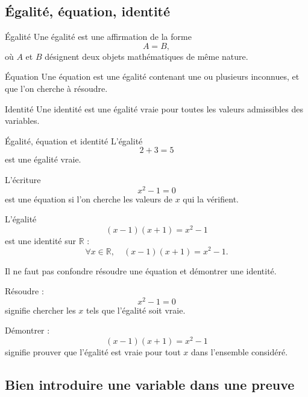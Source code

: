 \documentclass[11pt,a4paper]{article}
\begin{document}
\subsection{Égalité, équation, identité}

\begin{definitionbox}{Égalité}{}
Une égalité est une affirmation de la forme
\[
A=B,
\]
où $A$ et $B$ désignent deux objets mathématiques de même nature.
\end{definitionbox}

\begin{definitionbox}{Équation}{}
Une équation est une égalité contenant une ou plusieurs inconnues, et que l'on cherche à résoudre.
\end{definitionbox}

\begin{definitionbox}{Identité}{}
Une identité est une égalité vraie pour toutes les valeurs admissibles des variables.
\end{definitionbox}

\begin{exemplebox}{Égalité, équation et identité}{}
L'égalité
\[
2+3=5
\]
est une égalité vraie.

L'écriture
\[
x^2-1=0
\]
est une équation si l'on cherche les valeurs de $x$ qui la vérifient.

L'égalité
\[
(x-1)(x+1)=x^2-1
\]
est une identité sur $\mathbb{R}$ :
\[
\forall x\in\mathbb{R},\quad (x-1)(x+1)=x^2-1.
\]
\end{exemplebox}

\begin{erreurbox}
Il ne faut pas confondre résoudre une équation et démontrer une identité.

Résoudre :
\[
x^2-1=0
\]
signifie chercher les $x$ tels que l'égalité soit vraie.

Démontrer :
\[
(x-1)(x+1)=x^2-1
\]
signifie prouver que l'égalité est vraie pour tout $x$ dans l'ensemble considéré.
\end{erreurbox}

\subsection{Bien introduire une variable dans une preuve}
\end{document}
